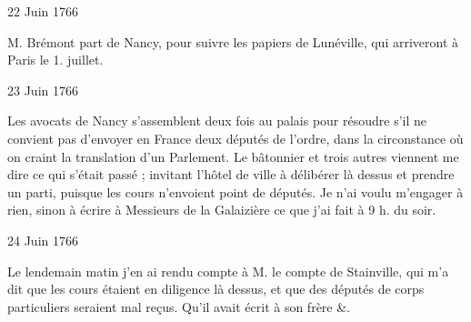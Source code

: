                      \begin{diary}{22 Juin 1766}{}


                           M. Brémont part de Nancy, pour suivre les
                           papiers de Lunéville, qui
                           arriveront à Paris
                           le 1.
                           juillet. \bigskip


                     \end{diary}

                     \begin{diary}{23 Juin 1766}{}

                         Les avocats de Nancy s'assemblent deux fois au
                           palais pour résoudre s'il
                           ne convient pas d'envoyer
                           en France deux députés de
                              l'ordre, dans la
                           circonstance où on craint la translation d'un
                           Parlement. Le bâtonnier et
                           trois autres viennent
                           me dire ce qui s'était passé ; invitant l'hôtel
                              de ville à délibérer là dessus et prendre un
                           parti, puisque les cours n'envoient point de
                           députés. Je n'ai voulu m'engager à rien,
                           sinon à écrire à Messieurs
                           de la Galaizière ce que
                           j'ai fait à 9 h. du soir. \bigskip


                     \end{diary}
                     \begin{diary}{24 Juin 1766}{}

                         Le lendemain matin j'en ai rendu
                           compte
                           à M. le compte de
                              Stainville,
                           qui m'a dit
                           que les cours étaient en diligence là dessus,
                           et que des députés de corps particuliers
                           seraient mal reçus. Qu'il avait écrit à son frère \&. \bigskip


                     \end{diary}


